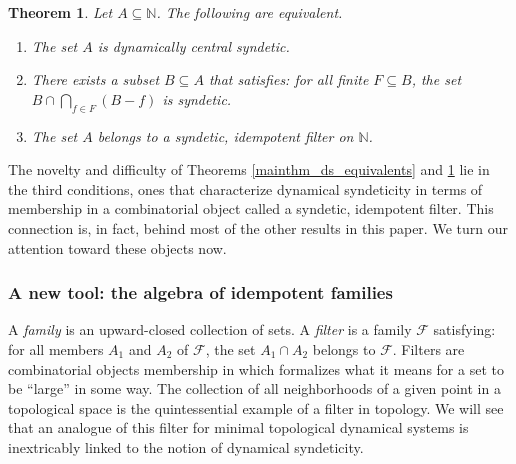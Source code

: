 \documentclass[letter,11pt]{article}
\theoremstyle{plain}
\theoremstyle{definition}
\theoremstyle{plain}
\newcounter{MainTheoremCounter}
\newtheorem{Maintheorem}[MainTheoremCounter]{Theorem}
\theoremstyle{plain}
\numberwithin{equation}{section}
\newcommand{\N}{\mathbb{N}}
\newcommand{\family}{\mathscr{F}}
\begin{document}
\begin{Maintheorem}
    \label{intro_mainthm_full_chars_of_dcsyndetic}
    Let $A \subseteq \N$.  The following are equivalent.
    \begin{enumerate}
        \item \label{intro_item_def_of_dcs}
        The set $A$ is dynamically central syndetic.

        \item \label{intro_item_dcs_combo_condition}
        There exists a subset $B \subseteq A$ that satisfies: for all finite $F \subseteq B$, the set $B \cap \bigcap_{f \in F} (B-f)$ is syndetic.

        \item \label{intro_item_member_of_sif}
        The set $A$ belongs to a syndetic, idempotent filter on $\N$.
    \end{enumerate}
\end{Maintheorem}

The novelty and difficulty of Theorems \ref{mainthm_ds_equivalents} and \ref{intro_mainthm_full_chars_of_dcsyndetic} lie in the third conditions, ones that characterize dynamical syndeticity in terms of membership in a combinatorial object called a syndetic, idempotent filter.  This connection is, in fact, behind most of the other results in this paper.  We turn our attention toward these objects now.

\subsubsection{A new tool: the algebra of idempotent families}
\label{sec_intro_algebra_of_filters}

A \emph{family} is an upward-closed collection of sets.  A \emph{filter} is a family $\family$ satisfying: for all members $A_1$ and $A_2$ of $\family$, the set $A_1 \cap A_2$ belongs to $\family$.  Filters are combinatorial objects membership in which formalizes what it means for a set to be ``large'' in some way. The collection of all neighborhoods of a given point in a topological space is the quintessential example of a filter in topology.  We will see that an analogue of this filter for minimal topological dynamical systems is inextricably linked to the notion of dynamical syndeticity.
\end{document}
